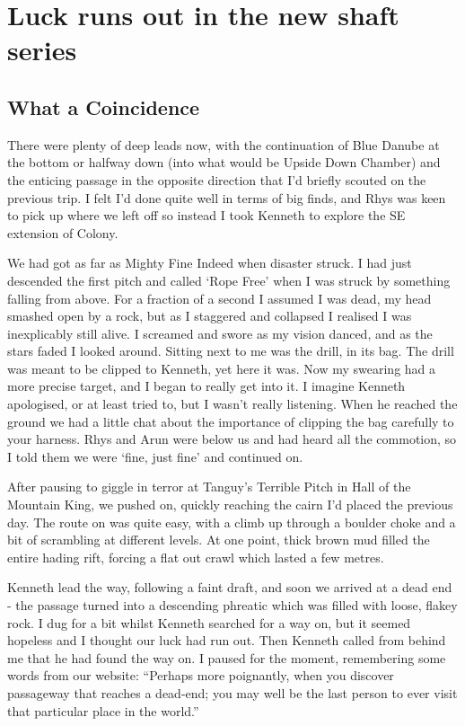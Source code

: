 \section{Luck runs out in the new shaft series}

\subsection{What a Coincidence}
There were plenty of deep leads now, with the continuation of Blue Danube at the bottom or halfway down (into what would be Upside Down Chamber) and the enticing passage in the opposite direction that I’d briefly scouted on the previous trip. I felt I’d done quite well in terms of big finds, and Rhys was keen to pick up where we left off so instead I took Kenneth to explore the SE extension of Colony.
 
We had got as far as Mighty Fine Indeed when disaster struck. I had just descended the first pitch and called ‘Rope Free’ when I was struck by something falling from above. For a fraction of a second I assumed I was dead, my head smashed open by a rock, but as I staggered and collapsed I realised I was inexplicably still alive. I screamed and swore as my vision danced, and as the stars faded I looked around. Sitting next to me was the drill, in its bag. The drill was meant to be clipped to Kenneth, yet here it was. Now my swearing had a more precise target, and I began to really get into it. I imagine Kenneth apologised, or at least tried to, but I wasn’t really listening. When he reached the ground we had a little chat about the importance of clipping the bag carefully to your harness. Rhys and Arun were below us and had heard all the commotion, so I told them we were ‘fine, just fine’ and continued on.
 
After pausing to giggle in terror at Tanguy’s Terrible Pitch in Hall of the Mountain King, we pushed on, quickly reaching the cairn I’d placed the previous day. The route on was quite easy, with a climb up through a boulder choke and a bit of scrambling at different levels. At one point, thick brown mud filled the entire hading rift, forcing a flat out crawl which lasted a few metres.
 
Kenneth lead the way, following a faint draft, and soon we arrived at a dead end - the passage turned into a descending phreatic which was filled with loose, flakey rock. I dug for a bit whilst Kenneth searched for a way on, but it seemed hopeless and I thought our luck had run out. Then Kenneth called from behind me that he had found the way on. I paused for the moment, remembering some words from our website: “Perhaps more poignantly, when you discover passageway that reaches a dead-end; you may well be the last person to ever visit that particular place in the world.”
 
